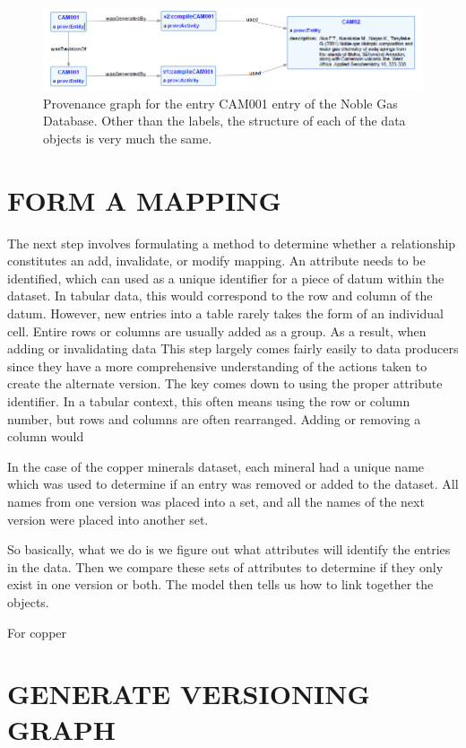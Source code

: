 \begin{figure}
	\centering
	\includegraphics[scale=0.70]{figures/CAM001v1v2.png}
	\caption{Provenance graph for the entry CAM001 entry of the Noble Gas Database.  Other than the labels, the structure of each of the data objects is very much the same.}
	\label{CAM001ProvGraph}
\end{figure}

\section{FORM A MAPPING}

The next step involves formulating a method to determine whether a relationship constitutes an add, invalidate, or modify mapping.
An attribute needs to be identified, which can used as a unique identifier for a piece of datum within the dataset.
In tabular data, this would correspond to the row and column of the datum.
However, new entries into a table rarely takes the form of an individual cell.
Entire rows or columns are usually added as a group.
As a result, when adding or invalidating data
This step largely comes fairly easily to data producers since they have a more comprehensive understanding of the actions taken to create the alternate version.
The key comes down to using the proper attribute identifier.
In a tabular context, this often means using the row or column number, but rows and columns are often rearranged.
Adding or removing a column would 

In the case of the copper minerals dataset, each mineral had a unique name which was used to determine if an entry was removed or added to the dataset.
All names from one version was placed into a set, and all the names of the next version were placed into another set.

So basically, what we do is we figure out what attributes will identify the entries in the data.
Then we compare these sets of attributes to determine if they only exist in one version or both.
The model then tells us how to link together the objects.

For copper

\section{GENERATE VERSIONING GRAPH}

